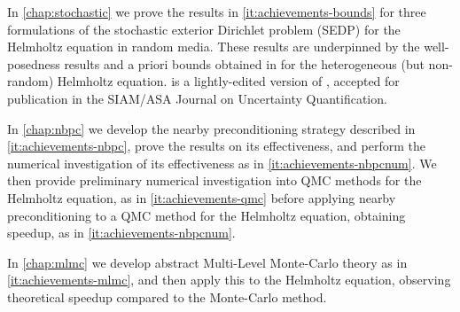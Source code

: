 In \cref{chap:stochastic} we prove the results in \cref{it:achievements-bounds} for three formulations of the stochastic exterior Dirichlet problem (SEDP) for the Helmholtz equation in random media. These results are underpinned by the well-posedness results and a priori bounds obtained in \cite{GrPeSp:19} for the heterogeneous (but non-random) Helmholtz equation.  is a lightly-edited version of \cite{PeSp:19}, accepted for publication in the SIAM/ASA Journal on Uncertainty Quantification.

In \cref{chap:nbpc} we develop the nearby preconditioning strategy described in \cref{it:achievements-nbpc}, prove the results on its effectiveness, and perform the numerical investigation of its effectiveness as in \cref{it:achievements-nbpcnum}. We then provide preliminary numerical investigation into QMC methods for the Helmholtz equation, as in \cref{it:achievements-qmc} before applying nearby preconditioning to a QMC method for the Helmholtz equation, obtaining speedup, as in \cref{it:achievements-nbpcnum}.

In \cref{chap:mlmc} we develop abstract Multi-Level Monte-Carlo theory as in \cref{it:achievements-mlmc}, and then apply this to the Helmholtz equation, observing theoretical speedup compared to the Monte-Carlo method.

